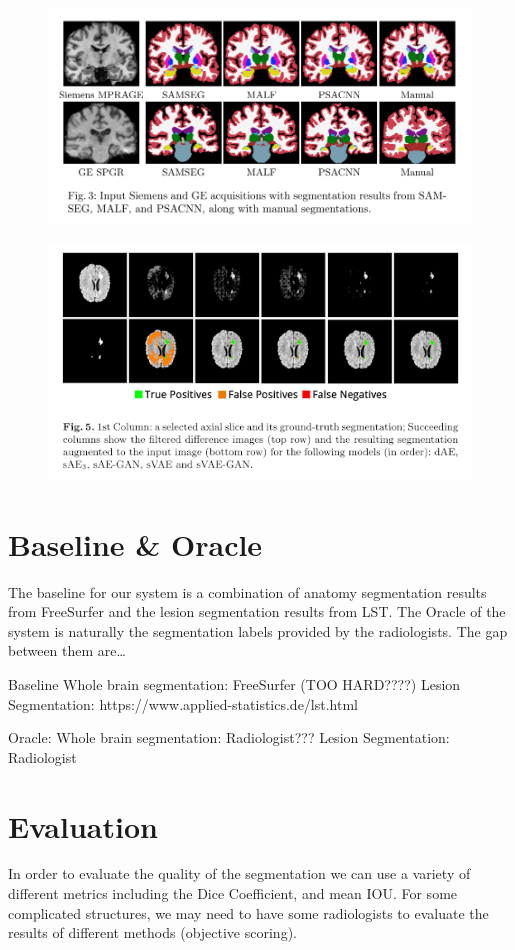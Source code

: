\documentclass[12pt]{article}
\begin{document}
\begin{figure}[htbp!]
\includegraphics[width=\textwidth]{ana_seg2.png}
\end{figure}

\begin{figure}[htbp!]
\includegraphics[width=\textwidth]{tumor_seg.png}
\end{figure}

\section{Baseline \& Oracle}
The baseline for our system is a combination of anatomy segmentation results from FreeSurfer and the lesion segmentation results from LST. The Oracle of the system is naturally the segmentation labels provided by the radiologists. The gap between them are… 

Baseline 
Whole brain segmentation:  FreeSurfer (TOO HARD????)
Lesion Segmentation: https://www.applied-statistics.de/lst.html

Oracle:
Whole brain segmentation:  Radiologist???
Lesion Segmentation: Radiologist

\section{Evaluation}
In order to evaluate the quality of the segmentation we can use a variety of different metrics including the Dice Coefficient, and mean IOU. For some complicated structures, we may need to have some radiologists to evaluate the results of different methods (objective scoring). 



\end{document}
